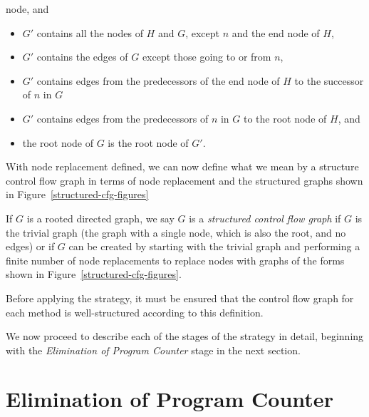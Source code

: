 \begin{defn}
\begin{itemize}
    node, and
    \begin{itemize}
    \item $G'$ contains all the nodes of $H$ and $G$, except $n$ and
      the end node of $H$,
    \item $G'$ contains the edges of $G$ except those going to or from
      $n$,
    \item $G'$ contains edges from the predecessors of the end node of
      $H$ to the successor of $n$ in $G$
    \item $G'$ contains edges from the predecessors of $n$ in $G$ to
      the root node of $H$, and
    \item the root node of $G$ is the root node of $G'$.
    \end{itemize}
  \end{itemize}
\end{defn}

With node replacement defined, we can now define what we mean by a
structure control flow graph in terms of node replacement and the
structured graphs shown in Figure~\ref{structured-cfg-figures}

\begin{defn}
  If $G$ is a rooted directed graph, we say $G$ is a \emph{structured
    control flow graph} if $G$ is the trivial graph (the graph with a
  single node, which is also the root, and no edges) or if $G$ can be
  created by starting with the trivial graph and performing a finite
  number of node replacements to replace nodes with graphs of the
  forms shown in Figure~\ref{structured-cfg-figures}.
\end{defn}

Before applying the strategy, it must be ensured that the control flow
graph for each method is well-structured according to this definition.

We now proceed to describe each of the stages of the strategy in
detail, beginning with the \emph{Elimination of Program Counter} stage
in the next section.

\section{Elimination of Program Counter}
\label{elimination-of-program-counter-section}

